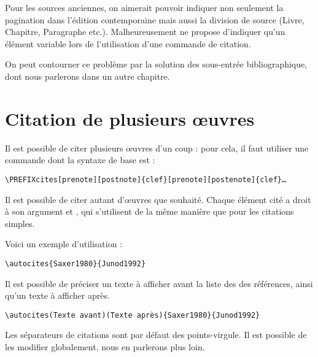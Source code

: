 \begin{quotation}
\cite[24 passage au demeurant fort intéressant.]{Junod1992}
\end{quotation}

\begin{attention}
Pour les sources anciennes, on aimerait pouvoir indiquer non seulement la pagination dans l'édition contemporaine mais aussi la division de source (Livre, Chapitre, Paragraphe etc.). Malheureusement  ne propose d'indiquer qu'un élément variable lors de l'utilisation d'une commande de citation.

On peut contourner ce problème par la solution des sous-entrée bibliographique, dont nous parlerons dans un autre chapitre. 
\end{attention}

\section{Citation de plusieurs œuvres}\label{citemultiple}

Il est possible de citer plusieurs œuvres d'un coup : pour cela, il faut utiliser une commande dont la syntaxe de base est :


\begin{verbatim}
\PREFIXcites[prenote][postnote]{clef}[prenote][postenote]{clef}…
\end{verbatim}

Il est possible de citer autant d'œuvres que souhaité. Chaque élément cité a droit à son argument  et , qui s'utilisent de la même manière que pour les citations simples.


Voici un exemple d'utilisation : 

\begin{verbatim}
\autocites{Saxer1980}{Junod1992}
\end{verbatim}

\begin{quotation}
\cites{Saxer1980}{Junod1992}
\end{quotation}

Il est possible de préciser un texte à afficher avant la liste des des références, ainsi qu'un texte à afficher après.

\begin{verbatim}
\autocites(Texte avant)(Texte après){Saxer1980}{Junod1992}
\end{verbatim}

Les séparateurs de citations sont par défaut des points-virgule. Il est possible de les modifier globalement, nous en parlerons plus loin.

